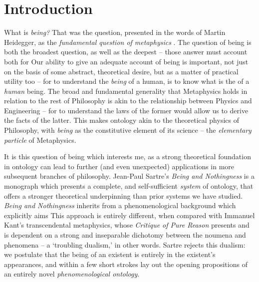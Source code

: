 \chapter{Introduction}



What is \emph{being?}  That was the question, presented in the words of Martin Heidegger, as the \emph{fundamental question of metaphysics} \autocite[1]{Heidegger}. The question of being is both the broadest question, as well as the deepest -- those answer must account both for  Our ability to give an adequate account of being is important, not just on the basis of some abstract, theoretical desire, but as a matter of practical utility too -- for to understand the \emph{being} of a human, is to know what is the  of a \emph{human} being. The broad and fundamental generality that Metaphysics holds in relation to the rest of Philosophy is akin to the relationship between Physics and Engineering -- for to understand the laws of the former would allow us to derive the facts of the latter. This makes ontology akin to the theoretical physics of Philosophy, with \emph{being} as the constitutive element of its science -- the \emph{elementary particle} of Metaphysics.


It is this question of being which interests me, as a strong theoretical foundation in ontology can lead to further (and even unexpected) applications in more subsequent branches of philosophy. Jean-Paul Sartre's \emph{Being and Nothingness} is a monograph which presents a complete, and self-sufficient \emph{system} of ontology, that offers a stronger theoretical underpinning than prior systems we have studied. \emph{Being and Nothingness} inherits from a phenomenological background which explicitly aims  This approach is entirely different, when compared with Immanuel Kant's transcendental metaphysics, whose \emph{Critique of Pure Reason} presents and is dependent on a strong and inseparable dichotomy between the noumena and phenomena -- a \enquote*{troubling dualism,} in other words. Sartre rejects this dualism: we postulate that the being of an existent is entirely in the existent's appearances, and within a few short strokes lay out the opening propositions of an entirely novel \emph{phenomenological ontology.}

